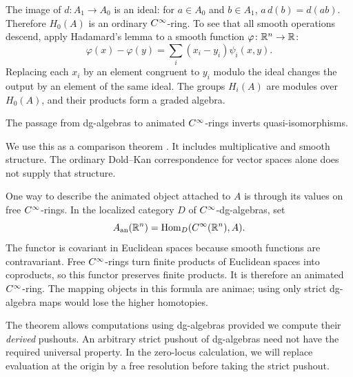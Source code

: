 The image of $d\colon A_1\to A_0$ is an ideal: for $a\in A_0$ and
$b\in A_1$, $a\,d(b)=d(ab)$. Therefore $H_0(A)$ is an ordinary
$C^\infty$-ring. To see that all smooth operations descend, apply Hadamard's
lemma to a smooth function $\varphi\colon\mathbb{R}^n\to\mathbb{R}$:
\[
 \varphi(x)-\varphi(y)=\sum_i(x_i-y_i)\psi_i(x,y).
\]
Replacing each $x_i$ by an element congruent to $y_i$ modulo the ideal
changes the output by an element of the same ideal. The groups $H_i(A)$
are modules over $H_0(A)$, and their products form a graded algebra.

The passage from dg-algebras to animated $C^\infty$-rings inverts
quasi-isomorphisms.



We use this as a comparison theorem
\cite[Theorem~3.3.12]{Steffens_Derived_Cinfty_Geometry_I}.
It includes multiplicative and smooth structure. The ordinary Dold--Kan
correspondence for vector spaces alone does not supply that structure.

One way to describe the animated object attached to $A$ is through its
values on free $C^\infty$-rings. In the localized category $D$ of
$C^\infty$-dg-algebras, set
\[
 A_{\mathrm{an}}(\mathbb{R}^n)=\operatorname{Hom}_D(C^\infty(\mathbb{R}^n),A).
\]
The functor is covariant in Euclidean spaces because smooth functions are
contravariant. Free $C^\infty$-rings turn finite products of Euclidean spaces
into coproducts, so this functor preserves finite products. It is therefore
an animated $C^\infty$-ring. The mapping objects in this formula are animae;
using only strict dg-algebra maps would lose the higher homotopies.

The theorem allows computations using dg-algebras provided we compute
their \emph{derived} pushouts. An arbitrary strict pushout of dg-algebras
need not have the required universal property. In the zero-locus
calculation, we will replace evaluation at the origin by a free resolution
before taking the strict pushout.

